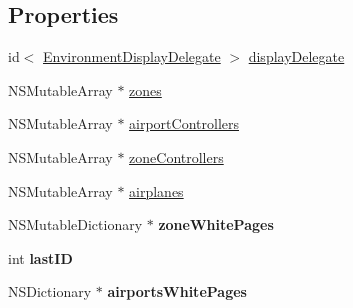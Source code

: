 \subsection*{\-Properties}
\begin{DoxyCompactItemize}
\item 
id$<$ \hyperlink{protocol_environment_display_delegate-p}{\-Environment\-Display\-Delegate} $>$ \hyperlink{interface_environment_a424601815b84dea769a7ffbaab1289bf}{display\-Delegate}
\item 
\-N\-S\-Mutable\-Array $\ast$ \hyperlink{interface_environment_a781ba0e2e19e6cca48eb70e0efac06eb}{zones}
\item 
\-N\-S\-Mutable\-Array $\ast$ \hyperlink{interface_environment_a82e2d51cea5f8cbbbcfc968348d1b9be}{airport\-Controllers}
\item 
\-N\-S\-Mutable\-Array $\ast$ \hyperlink{interface_environment_a3d62231f10bae1d800466e43bfcc2da7}{zone\-Controllers}
\item 
\-N\-S\-Mutable\-Array $\ast$ \hyperlink{interface_environment_a59a7f74390b883720a224468155bf5f8}{airplanes}
\item 
\hypertarget{interface_environment_a1428d4c087fbe0c8ff8246c9cf88fbef}{
\-N\-S\-Mutable\-Dictionary $\ast$ {\bfseries zone\-White\-Pages}}
\label{interface_environment_a1428d4c087fbe0c8ff8246c9cf88fbef}

\item 
\hypertarget{interface_environment_a16d985987c2d74227af4c68c1e7d0175}{
int {\bfseries last\-I\-D}}
\label{interface_environment_a16d985987c2d74227af4c68c1e7d0175}

\item 
\hypertarget{interface_environment_ae659363a7f14f24a41ce7272a361b084}{
\-N\-S\-Dictionary $\ast$ {\bfseries airports\-White\-Pages}}
\label{interface_environment_ae659363a7f14f24a41ce7272a361b084}

\end{DoxyCompactItemize}
